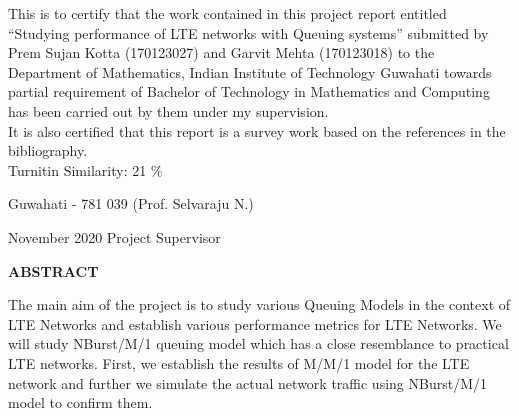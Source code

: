 \documentclass[12pt,a4paper]{report}
\theoremstyle{plain}
\theoremstyle{definition}
\theoremstyle{remark}
\begin{document}
\noindent
This is to certify that the work contained in this project report entitled 
“Studying performance of LTE networks with Queuing systems” submitted by Prem Sujan Kotta (170123027) and Garvit Mehta (170123018) 
to the Department of Mathematics, Indian Institute of Technology Guwahati towards partial requirement of
Bachelor of Technology in Mathematics and Computing has been carried out by them under
my supervision. \\

\noindent
It is also certified that this report is a survey work based on the references
in the bibliography.\\

\noindent
Turnitin Similarity: 21 \%
%

\vspace{4cm}

\noindent Guwahati - 781 039 \hfill   (Prof. Selvaraju N.)

\noindent November 2020 \hfill Project Supervisor

\clearpage

\begin{center}
{\Large{\bf{ABSTRACT}}}
\end{center}


The main aim of the project is to study various Queuing Models in the context of LTE Networks and establish various performance metrics for LTE Networks. We will study NBurst/M/1 queuing model which has a close resemblance to practical LTE networks. First, we establish the results of M/M/1 model for the LTE network and further we simulate the actual network traffic using NBurst/M/1 model to confirm them.

\clearpage



\tableofcontents
\clearpage
\listoffigures


\newpage

\setcounter{page}{1}












\nocite{fundamentals}\nocite{influ}\nocite{comp}



\end{document}

